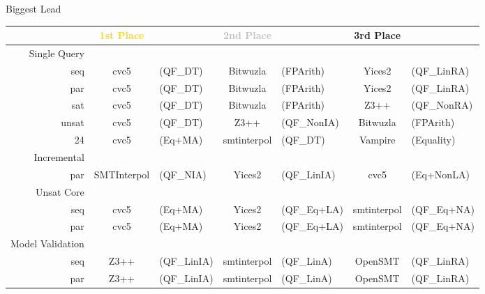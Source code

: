 \documentclass[table]{beamer}
\def\emph#1{\textcolor{MYblue}{#1}}
\begin{document}
\begin{frame}{Biggest Lead}
  \begin{tabular}{r|c@{}lc@{}lc@{}l}
    &\textcolor{gold}{\textbf{1st Place}} &&
    \textcolor{silver}{\textbf{2nd Place}} &&
    \textcolor{bronze}{\textbf{3rd Place}}\\
    \hline
    \emph{Single Query}\\
    seq & cvc5&{\tiny(QF\_DT)} & Bitwuzla&{\tiny(FPArith)} & Yices2&{\tiny(QF\_LinRA)} \\
    par & cvc5&{\tiny(QF\_DT)} & Bitwuzla&{\tiny(FPArith)} & Yices2&{\tiny(QF\_LinRA)} \\
    sat & cvc5&{\tiny(QF\_DT)} & Bitwuzla&{\tiny(FPArith)} & Z3++&{\tiny(QF\_NonRA)} \\
    unsat & cvc5&{\tiny(QF\_DT)} & Z3++&{\tiny(QF\_NonIA)} & Bitwuzla&{\tiny(FPArith)} \\
    24 &  cvc5&{\tiny(Eq+MA)} & smtinterpol&{\tiny(QF\_DT)} & Vampire&{\tiny(Equality)}\\[3pt]
    \pause
    \emph{Incremental}\\
    par & SMTInterpol&{\tiny(QF\_NIA)}
    &Yices2&{\tiny(QF\_LinIA)} & cvc5&{\tiny(Eq+NonLA)} \\[3pt]
    \pause
    \emph{Unsat Core}\\
    seq & cvc5&{\tiny(Eq+MA)} &    Yices2&{\tiny(QF\_Eq+LA)} &    smtinterpol&{\tiny(QF\_Eq+NA)} \\
    par & cvc5&{\tiny(Eq+MA)} &    Yices2&{\tiny(QF\_Eq+LA)} &    smtinterpol&{\tiny(QF\_Eq+NA)} \\
    \pause
    \emph{Model Validation}\\
    seq &  Z3++&{\tiny(QF\_LinIA)} & smtinterpol&{\tiny(QF\_LinA)}        & OpenSMT&{\tiny(QF\_LinRA)} \\
    par &  Z3++&{\tiny(QF\_LinIA)} & smtinterpol&{\tiny(QF\_LinA)}        & OpenSMT&{\tiny(QF\_LinRA)} \\
  \end{tabular}
\end{frame}
\end{document}
